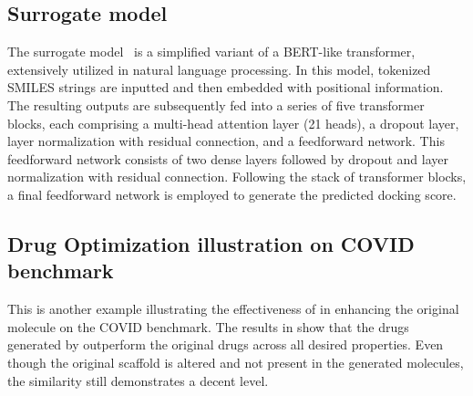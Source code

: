 \subsection{Surrogate model}\label{app:surrogate_model}

{The surrogate model~\citep{vasan23} is a simplified variant of a BERT-like transformer, extensively utilized in natural language processing. In this model, tokenized SMILES strings are inputted and then embedded with positional information. The resulting outputs are subsequently fed into a series of five transformer blocks, each comprising a multi-head attention layer (21 heads), a dropout layer, layer normalization with residual connection, and a feedforward network. This feedforward network consists of two dense layers followed by dropout and layer normalization with residual connection. Following the stack of transformer blocks, a final feedforward network is employed to generate the predicted docking score.}














\subsection{Drug Optimization illustration on COVID benchmark}\label{app:example_2}
{This is another example illustrating the effectiveness of \algname in enhancing the original molecule on the COVID benchmark. The results in  show that the drugs generated by \algname outperform the original drugs across all desired properties. Even though the original scaffold is altered and not present in the generated molecules, the similarity still demonstrates a decent level.}


